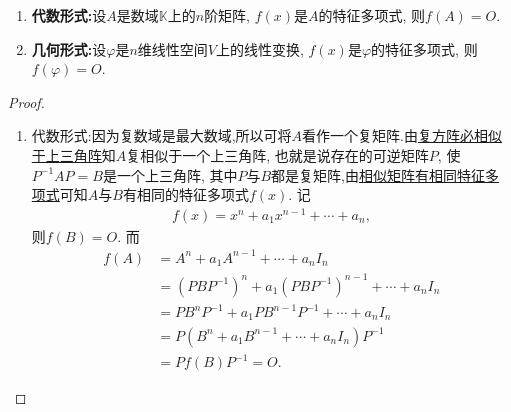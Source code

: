 \documentclass[../../main.tex]{subfiles}
\begin{document}
\begin{theorem}\label{theorem:Cayley-Hamilton定理}
\begin{enumerate}
\item \textbf{代数形式:}设$A$是数域$\mathbb{K}$上的$n$阶矩阵, $f(x)$是$A$的特征多项式, 则$f(A) = O$.

\item \textbf{几何形式:}设$\varphi$是$n$维线性空间$V$上的线性变换, $f(x)$是$\varphi$的特征多项式, 则$f(\varphi) = O$.
\end{enumerate}
\end{theorem}
\begin{proof}
\begin{enumerate}
\item {\heiti 代数形式:}因为复数域是最大数域,所以可将$A$看作一个复矩阵.由\hyperref[theorem:复方阵必相似于上三角阵]{复方阵必相似于上三角阵}知$A$复相似于一个上三角阵, 也就是说存在的可逆矩阵$P$, 使$P^{-1}AP = B$是一个上三角阵, 其中$P$与$B$都是复矩阵,由\hyperref[theorem:相似矩阵有相同的特征多项式与特征值]{相似矩阵有相同特征多项式}可知$A$与$B$有相同的特征多项式$f(x)$. 记
\begin{align*}
f(x) = x^n + a_1 x^{n-1} + \cdots + a_n,
\end{align*}
则$f(B) = O$. 而
\begin{align*}
f(A) &= A^n + a_1 A^{n-1} + \cdots + a_n I_n \\
&= (PBP^{-1})^n + a_1 (PBP^{-1})^{n-1} + \cdots + a_n I_n \\
&= PB^n P^{-1} + a_1 PB^{n-1} P^{-1} + \cdots + a_n I_n \\
&= P(B^n + a_1 B^{n-1} + \cdots + a_n I_n)P^{-1} \\
&= P f(B) P^{-1} = O.
\end{align*}


\end{enumerate}
\end{proof}
\end{document}
